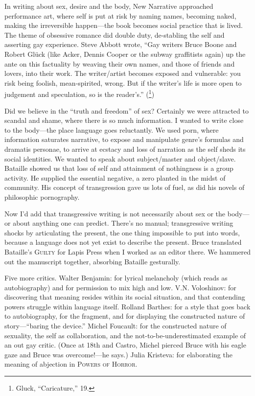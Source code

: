 \documentclass[
]{memoir}
\begin{document}
In writing about sex, desire and the body, New Narrative approached
performance art, where self is put at risk by naming names, becoming
naked, making the irreversible happen---the book becomes social practice
that is lived. The theme of obsessive romance did double duty,
de-stabling the self and asserting gay experience. Steve Abbott wrote,
``Gay writers Bruce Boone and Robert Glück (like Acker, Dennis Cooper or
the subway graffitists again) up the ante on this factuality by weaving
their own names, and those of friends and lovers, into their work. The
writer/artist becomes exposed and vulnerable: you risk being foolish,
mean-spirited, wrong. But if the writer's life is more open to judgement
and speculation, so is the reader's.'' (\footnote{Gluck, ``Caricature,''
  19.})

Did we believe in the ``truth and freedom'' of sex? Certainly we were
attracted to scandal and shame, where there is so much information. I
wanted to write close to the body---the place language goes reluctantly.
We used porn, where information saturates narrative, to expose and
manipulate genre's formulas and dramatis personae, to arrive at ecstacy
and loss of narration as the self sheds its social identities. We wanted
to speak about subject/master and object/slave. Bataille showed us that
loss of self and attainment of nothingness is a group activity. He
supplied the essential negative, a zero planted in the midst of
community. His concept of transgression gave us lots of fuel, as did his
novels of philosophic pornography.

Now I'd add that transgressive writing is not necessarily about sex or
the body---or about anything one can predict. There's no manual;
transgressive writing shocks by articulating the present, the one thing
impossible to put into words, because a language does not yet exist to
describe the present. Bruce translated Bataille's \textsc{Guilty} for
Lapis Press when I worked as an editor there. We hammered out the
manuscript together, absorbing Bataille gesturally.

Five more critics. Walter Benjamin: for lyrical melancholy (which reads
as autobiography) and for permission to mix high and low. V.N.
Voloshinov: for discovering that meaning resides within its social
situation, and that contending powers struggle within language itself.
Rolland Barthes: for a style that goes back to autobiography, for the
fragment, and for displaying the constructed nature of story---``baring
the device.'' Michel Foucault: for the constructed nature of sexuality,
the self as collaboration, and the not-to-be-underestimated example of
an out gay critic. (Once at 18th and Castro, Michel pierced Bruce with
his eagle gaze and Bruce was overcome!---he says.) Julia Kristeva: for
elaborating the meaning of abjection in \textsc{Powers of Horror}.
\end{document}
